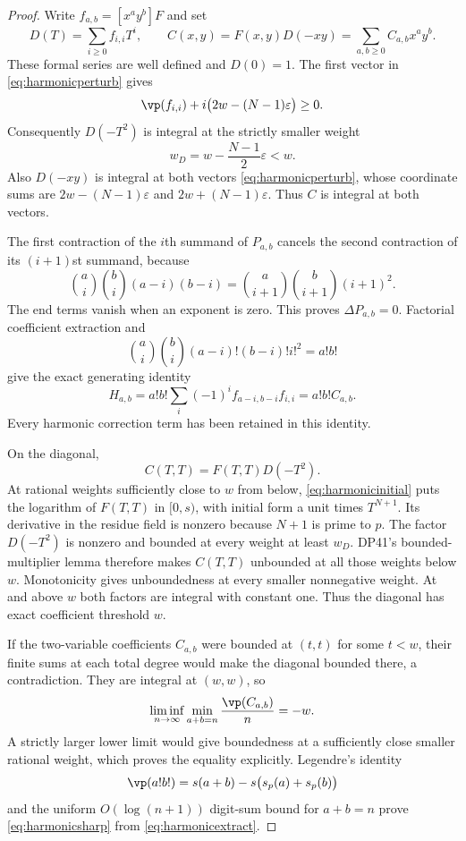 \begin{proof}
Write $f_{a,b}=[x^ay^b]F$ and set
\[
 D(T)=\sum_{i\ge0}f_{i,i}T^i,\qquad
 C(x,y)=F(x,y)D(-xy)=\sum_{a,b\ge0}C_{a,b}x^ay^b.
\]
These formal series are well defined and $D(0)=1$.
The first vector in \eqref{eq:harmonicperturb} gives
\[
 \vp(f_{i,i})+i\bigl(2w-(N-1)\varepsilon\bigr)\ge0.
\]
Consequently $D(-T^2)$ is integral at the strictly smaller weight
\[
 w_D=w-\frac{N-1}{2}\varepsilon<w.
\]
Also $D(-xy)$ is integral at both vectors \eqref{eq:harmonicperturb}, whose coordinate sums are
$2w-(N-1)\varepsilon$ and $2w+(N-1)\varepsilon$.
Thus $C$ is integral at both vectors.

The first contraction of the $i$th summand of $P_{a,b}$ cancels the second contraction of its $(i+1)$st summand, because
\[
 \binom ai\binom bi(a-i)(b-i)
 =\binom a{i+1}\binom b{i+1}(i+1)^2.
\]
The end terms vanish when an exponent is zero.
This proves $\Delta P_{a,b}=0$.
Factorial coefficient extraction and
\[
 \binom ai\binom bi(a-i)!(b-i)!i!^2=a!b!
\]
give the exact generating identity
\begin{equation}\label{eq:harmonicextract}
 H_{a,b}=a!b!\sum_i(-1)^if_{a-i,b-i}f_{i,i}
         =a!b!C_{a,b}.
\end{equation}
Every harmonic correction term has been retained in this identity.

On the diagonal,
\[
 C(T,T)=F(T,T)D(-T^2).
\]
At rational weights sufficiently close to $w$ from below,
\eqref{eq:harmonicinitial} puts the logarithm of $F(T,T)$ in $[0,s)$, with initial form a unit times $T^{N+1}$.
Its derivative in the residue field is nonzero because $N+1$ is prime to $p$.
The factor $D(-T^2)$ is nonzero and bounded at every weight at least $w_D$.
DP41's bounded-multiplier lemma therefore makes $C(T,T)$ unbounded at all those weights below $w$.
Monotonicity gives unboundedness at every smaller nonnegative weight.
At and above $w$ both factors are integral with constant one.
Thus the diagonal has exact coefficient threshold $w$.

If the two-variable coefficients $C_{a,b}$ were bounded at $(t,t)$ for some $t<w$, their finite sums at each total degree would make the diagonal bounded there, a contradiction.
They are integral at $(w,w)$, so
\[
 \liminf_{n\to\infty}\min_{a+b=n}\frac{\vp(C_{a,b})}{n}=-w.
\]
A strictly larger lower limit would give boundedness at a sufficiently close smaller rational weight, which proves the equality explicitly.
Legendre's identity
\[
 \vp(a!b!)=s(a+b)-s\bigl(s_p(a)+s_p(b)\bigr)
\]
and the uniform $O(\log(n+1))$ digit-sum bound for $a+b=n$ prove
\eqref{eq:harmonicsharp} from \eqref{eq:harmonicextract}.


\end{proof}
